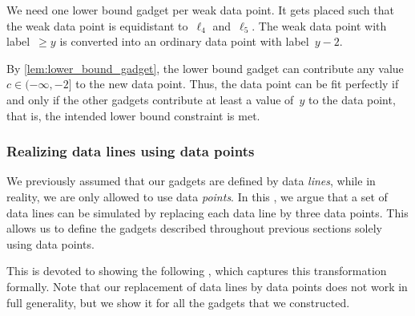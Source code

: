 We need one lower bound gadget per weak data point.
It gets placed such that the weak data point is equidistant to~$\ell_4$ and~$\ell_5$.
The weak data point with label~$\geq y$ is converted into an ordinary data point with label~$y-2$.

By \cref{lem:lower_bound_gadget}, the lower bound gadget can contribute any value $c \in (-\infty,-2]$ to the new data point.
Thus, the data point can be fit perfectly if and only if the other gadgets contribute at least a value of~$y$ to the data point, that is, the intended lower bound constraint is met.

\subsubsection{Realizing data lines using data points}
\label{sec:data_lines_to_data_points}

We previously assumed that our gadgets are defined by data \emph{lines}, while in reality, we are only allowed to use data \emph{points}.
In this , we argue that a set of data lines can be simulated by replacing each data line by three data points.
This allows us to define the gadgets described throughout previous sections solely using data points.

This  is devoted to showing the following , which captures this transformation formally.
Note that our replacement of data lines by data points does not work in full generality, but we show it for all the gadgets that we constructed.


